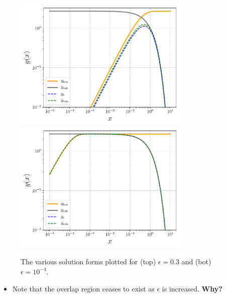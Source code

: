 \begin{figure}[!h]
	\centering
	\includegraphics[width=0.75\textwidth]{./plots/pdf/strogatz-wk12-composite-eps3e-1.pdf}
	\includegraphics[width=0.75\textwidth]{./plots/pdf/strogatz-wk12-composite-eps1e-4.pdf}
	\caption{The various solution forms plotted for (top) $\epsilon = 0.3$ and (bot) $\epsilon=10^{-4}$.}
	\label{fig:strogatz-wk12-composite}
\end{figure} 
\begin{itemize}
	\item Note that the overlap region ceases to exist as $\epsilon$ is increased. {\bf Why?}
\end{itemize}